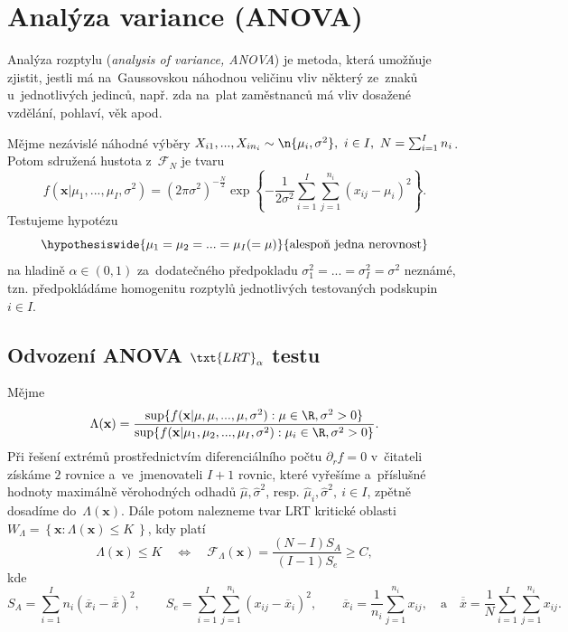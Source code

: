 \section{Analýza variance (ANOVA)}
Analýza rozptylu (\textit{analysis of variance, ANOVA}) je metoda, která umožňuje zjistit, jestli má na~Gaussovskou náhodnou veličinu vliv některý ze~znaků u~jednotlivých jedinců, např. zda na~plat zaměstnanců má vliv dosažené vzdělání, pohlaví, věk apod.

Mějme nezávislé náhodné výběry $X_{i1},...,X_{in_i}\sim\n{\mu_i,\sigma^2},~i\in I,~N=\sum_{i=1}^{I}n_i$. Potom sdružená hustota z~$\mathcal{F}_N$ je tvaru
$$ f(\textbf{x}|\mu_1,...,\mu_I,\sigma^2)=(2\pi\sigma^2)^{-\frac{N}{2}}\exp\left\{ -\frac{1}{2\sigma^2}\sum_{i=1}^{I}\sum_{j=1}^{n_i}(x_{ij}-\mu_i)^2 \right\}. $$
Testujeme hypotézu
$$ \hypothesiswide{\mu_1=\mu_2=...=\mu_I(=\mu)}{\text{alespoň jedna nerovnost}} $$
na hladině $\alpha\in(0,1)$ za~dodatečného předpokladu $\sigma_1^2=...=\sigma_I^2=\sigma^2$ neznámé, tzn. předpokládáme homogenitu rozptylů jednotlivých testovaných podskupin $i\in I$.

\subsection*{Odvození ANOVA $\txt{LRT}_\alpha$ testu}
Mějme
$$ \Lambda(\textbf{x})=\frac{\sup\{ f(\textbf{x}|\mu,\mu,...,\mu,\sigma^2):\mu\in\R,\sigma^2>0 \}}{\sup\{ f(\textbf{x}|\mu_1,\mu_2,...,\mu_I,\sigma^2):\mu_i\in\R,\sigma^2>0 \}}. $$
Při řešení extrémů prostřednictvím diferenciálního počtu $\partial_r f=0$ v~čitateli získáme $2$ rovnice a~ve~jmenovateli $I+1$ rovnic, které vyřešíme a~příslušné hodnoty maximálně věrohodných odhadů $\widehat{\mu},\widehat{\sigma}^2$, resp. $\widehat{\mu}_i,\widehat{\sigma}^2,~i\in I$, zpětně dosadíme do~$\Lambda(\textbf{x})$. Dále potom nalezneme tvar LRT kritické oblasti $W_\Lambda=\left\{ \textbf{x}:\Lambda(\textbf{x})\leq K~\right\}$, kdy platí
$$ \Lambda(\textbf{x})\leq K\quad\Leftrightarrow\quad\mathcal{F}_\Lambda(\textbf{x})=\frac{(N-I)S_A}{(I-1)S_e}\geq C, $$ kde $$
S_A=\sum_{i=1}^{I}n_i(\overline{x}_i-\overline{\overline{x}})^2,\qquad S_e=\sum_{i=1}^{I}\sum_{j=1}^{n_i}(x_{ij}-\overline{x}_i)^2,\qquad \overline{x}_i=\frac{1}{n_i}\sum_{j=1}^{n_i}x_{ij},\quad\text{a}\quad \overline{\overline{x}}=\frac{1}{N}\sum_{i=1}^{I}\sum_{j=1}^{n_i}x_{ij}.
$$

